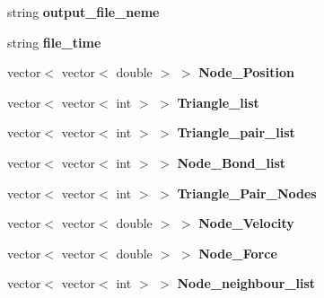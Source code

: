 \begin{DoxyCompactItemize}
\item 
string {\bfseries output\+\_\+file\+\_\+neme}\hypertarget{classMembrane_ab411c25e4dd5ac0ce13060eff8a6a923}{}\label{classMembrane_ab411c25e4dd5ac0ce13060eff8a6a923}

\item 
string {\bfseries file\+\_\+time}\hypertarget{classMembrane_aeb5028f36a7d69ba7ed0c5cfe0af545f}{}\label{classMembrane_aeb5028f36a7d69ba7ed0c5cfe0af545f}

\item 
vector$<$ vector$<$ double $>$ $>$ {\bfseries Node\+\_\+\+Position}\hypertarget{classMembrane_a71d4c2117b63d8145b236bd51668033f}{}\label{classMembrane_a71d4c2117b63d8145b236bd51668033f}

\item 
vector$<$ vector$<$ int $>$ $>$ {\bfseries Triangle\+\_\+list}\hypertarget{classMembrane_ad61d1fbb53ef3a3fb7b4670581327051}{}\label{classMembrane_ad61d1fbb53ef3a3fb7b4670581327051}

\item 
vector$<$ vector$<$ int $>$ $>$ {\bfseries Triangle\+\_\+pair\+\_\+list}\hypertarget{classMembrane_ad4f0d5f17a9f50e1505e4264ba6e139a}{}\label{classMembrane_ad4f0d5f17a9f50e1505e4264ba6e139a}

\item 
vector$<$ vector$<$ int $>$ $>$ {\bfseries Node\+\_\+\+Bond\+\_\+list}\hypertarget{classMembrane_a653506414e86b70ec87450c4639abaa5}{}\label{classMembrane_a653506414e86b70ec87450c4639abaa5}

\item 
vector$<$ vector$<$ int $>$ $>$ {\bfseries Triangle\+\_\+\+Pair\+\_\+\+Nodes}\hypertarget{classMembrane_a16c7d8283b2b53178f1c0c8c8a3fe0cf}{}\label{classMembrane_a16c7d8283b2b53178f1c0c8c8a3fe0cf}

\item 
vector$<$ vector$<$ double $>$ $>$ {\bfseries Node\+\_\+\+Velocity}\hypertarget{classMembrane_ac6661af8931b8e555f4cb9fbdcb394d0}{}\label{classMembrane_ac6661af8931b8e555f4cb9fbdcb394d0}

\item 
vector$<$ vector$<$ double $>$ $>$ {\bfseries Node\+\_\+\+Force}\hypertarget{classMembrane_a3c1eb46e7611377e2cef72ff17255e32}{}\label{classMembrane_a3c1eb46e7611377e2cef72ff17255e32}

\item 
vector$<$ vector$<$ int $>$ $>$ {\bfseries Node\+\_\+neighbour\+\_\+list}\hypertarget{classMembrane_a705770b79289d894b0b58919e810d71a}{}\label{classMembrane_a705770b79289d894b0b58919e810d71a}


\end{DoxyCompactItemize}
